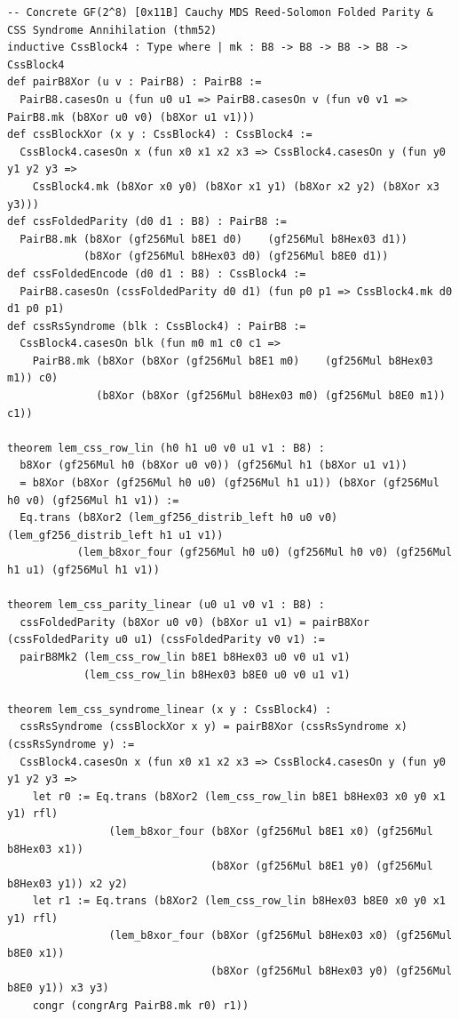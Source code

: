 \documentclass[11pt,letterpaper]{article}
\theoremstyle{spectralthm}
\begin{document}
\begin{lstlisting}[language=Lean4,caption={Standalone Pure Init.Prelude Term-Mode Lean 4 Kernel Suite (thm30--thm61, v0.0.0, 0 sorry, 0 axioms).},label={lst:lean_unified}]
-- Concrete GF(2^8) [0x11B] Cauchy MDS Reed-Solomon Folded Parity & CSS Syndrome Annihilation (thm52)
inductive CssBlock4 : Type where | mk : B8 -> B8 -> B8 -> B8 -> CssBlock4
def pairB8Xor (u v : PairB8) : PairB8 :=
  PairB8.casesOn u (fun u0 u1 => PairB8.casesOn v (fun v0 v1 => PairB8.mk (b8Xor u0 v0) (b8Xor u1 v1)))
def cssBlockXor (x y : CssBlock4) : CssBlock4 :=
  CssBlock4.casesOn x (fun x0 x1 x2 x3 => CssBlock4.casesOn y (fun y0 y1 y2 y3 =>
    CssBlock4.mk (b8Xor x0 y0) (b8Xor x1 y1) (b8Xor x2 y2) (b8Xor x3 y3)))
def cssFoldedParity (d0 d1 : B8) : PairB8 :=
  PairB8.mk (b8Xor (gf256Mul b8E1 d0)    (gf256Mul b8Hex03 d1))
            (b8Xor (gf256Mul b8Hex03 d0) (gf256Mul b8E0 d1))
def cssFoldedEncode (d0 d1 : B8) : CssBlock4 :=
  PairB8.casesOn (cssFoldedParity d0 d1) (fun p0 p1 => CssBlock4.mk d0 d1 p0 p1)
def cssRsSyndrome (blk : CssBlock4) : PairB8 :=
  CssBlock4.casesOn blk (fun m0 m1 c0 c1 =>
    PairB8.mk (b8Xor (b8Xor (gf256Mul b8E1 m0)    (gf256Mul b8Hex03 m1)) c0)
              (b8Xor (b8Xor (gf256Mul b8Hex03 m0) (gf256Mul b8E0 m1))    c1))

theorem lem_css_row_lin (h0 h1 u0 v0 u1 v1 : B8) :
  b8Xor (gf256Mul h0 (b8Xor u0 v0)) (gf256Mul h1 (b8Xor u1 v1))
  = b8Xor (b8Xor (gf256Mul h0 u0) (gf256Mul h1 u1)) (b8Xor (gf256Mul h0 v0) (gf256Mul h1 v1)) :=
  Eq.trans (b8Xor2 (lem_gf256_distrib_left h0 u0 v0) (lem_gf256_distrib_left h1 u1 v1))
           (lem_b8xor_four (gf256Mul h0 u0) (gf256Mul h0 v0) (gf256Mul h1 u1) (gf256Mul h1 v1))

theorem lem_css_parity_linear (u0 u1 v0 v1 : B8) :
  cssFoldedParity (b8Xor u0 v0) (b8Xor u1 v1) = pairB8Xor (cssFoldedParity u0 u1) (cssFoldedParity v0 v1) :=
  pairB8Mk2 (lem_css_row_lin b8E1 b8Hex03 u0 v0 u1 v1)
            (lem_css_row_lin b8Hex03 b8E0 u0 v0 u1 v1)

theorem lem_css_syndrome_linear (x y : CssBlock4) :
  cssRsSyndrome (cssBlockXor x y) = pairB8Xor (cssRsSyndrome x) (cssRsSyndrome y) :=
  CssBlock4.casesOn x (fun x0 x1 x2 x3 => CssBlock4.casesOn y (fun y0 y1 y2 y3 =>
    let r0 := Eq.trans (b8Xor2 (lem_css_row_lin b8E1 b8Hex03 x0 y0 x1 y1) rfl)
                (lem_b8xor_four (b8Xor (gf256Mul b8E1 x0) (gf256Mul b8Hex03 x1))
                                (b8Xor (gf256Mul b8E1 y0) (gf256Mul b8Hex03 y1)) x2 y2)
    let r1 := Eq.trans (b8Xor2 (lem_css_row_lin b8Hex03 b8E0 x0 y0 x1 y1) rfl)
                (lem_b8xor_four (b8Xor (gf256Mul b8Hex03 x0) (gf256Mul b8E0 x1))
                                (b8Xor (gf256Mul b8Hex03 y0) (gf256Mul b8E0 y1)) x3 y3)
    congr (congrArg PairB8.mk r0) r1))


\end{lstlisting}
\end{document}
